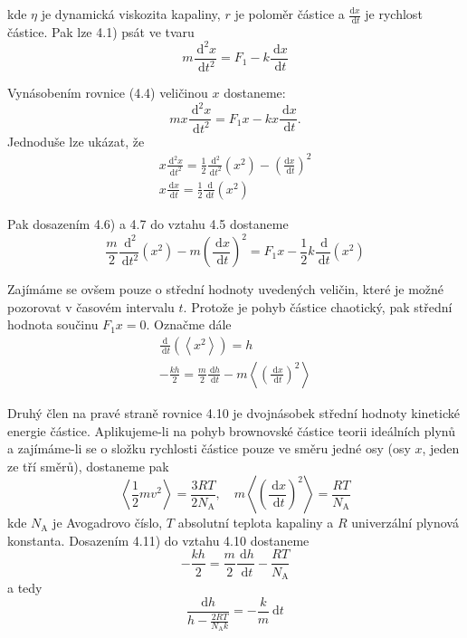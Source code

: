 \documentclass[czech,11pt,a4paper]{article}
\begin{document}
\begin{multicols}{2}
		kde $\eta$ je dynamická viskozita kapaliny, $r$ je poloměr částice a $\frac{\mathrm{d} x}{\mathrm{~d} t}$ je rychlost částice. Pak lze 4.1) psát ve tvaru
		\begin{equation}
			m \frac{\mathrm{~d}^{2} x}{\mathrm{~d} t^{2}}=F_{1}-k \frac{\mathrm{~d} x}{\mathrm{~d} t}
		\end{equation}
		
		
		Vynásobením rovnice (4.4) veličinou $x$ dostaneme:
		\begin{equation}
			m x \frac{\mathrm{~d}^{2} x}{\mathrm{~d} t^{2}}=F_{1} x-k x \frac{\mathrm{~d} x}{\mathrm{~d} t} .
		\end{equation}
		Jednoduše lze ukázat, že
		\begin{gather}
			x \frac{\mathrm{~d}^{2} x}{\mathrm{~d} t^{2}}=\frac{1}{2} \frac{\mathrm{~d}^{2}}{\mathrm{~d} t^{2}}\left(x^{2}\right)-\left(\frac{\mathrm{d} x}{\mathrm{~d} t}\right)^{2} \\
			x \frac{\mathrm{~d} x}{\mathrm{~d} t}=\frac{1}{2} \frac{\mathrm{~d}}{\mathrm{~d} t}\left(x^{2}\right)
		\end{gather}
		
		
		Pak dosazením 4.6) a 4.7 do vztahu 4.5 dostaneme
		$$
		\frac{m}{2} \frac{\mathrm{~d}^{2}}{\mathrm{~d} t^{2}}\left(x^{2}\right)-m\left(\frac{\mathrm{~d} x}{\mathrm{~d} t}\right)^{2}=F_{1} x-\frac{1}{2} k \frac{\mathrm{~d}}{\mathrm{~d} t}\left(x^{2}\right)
		$$
		
		Zajímáme se ovšem pouze o střední hodnoty uvedených veličin, které je možné pozorovat v časovém intervalu $t$. Protože je pohyb částice chaotický, pak střední hodnota součinu $F_{1} x=0$. Označme dále
		$$
		\begin{gathered}
			\frac{\mathrm{d}}{\mathrm{~d} t}\left(\left\langle x^{2}\right\rangle\right)=h \\
			-\frac{k h}{2}=\frac{m}{2} \frac{\mathrm{~d} h}{\mathrm{~d} t}-m\left\langle\left(\frac{\mathrm{~d} x}{\mathrm{~d} t}\right)^{2}\right\rangle
		\end{gathered}
		$$
		
		Druhý člen na pravé straně rovnice 4.10 je dvojnásobek střední hodnoty kinetické energie částice. Aplikujeme-li na pohyb brownovské částice teorii ideálních plynů a zajímáme-li se o složku rychlosti částice pouze ve směru jedné osy (osy $x$, jeden ze tří směrů), dostaneme pak
		$$
		\left\langle\frac{1}{2} m v^{2}\right\rangle=\frac{3 R T}{2 N_{\mathrm{A}}}, \quad m\left\langle\left(\frac{\mathrm{~d} x}{\mathrm{~d} t}\right)^{2}\right\rangle=\frac{R T}{N_{\mathrm{A}}}
		$$
		kde $N_{\mathrm{A}}$ je Avogadrovo číslo, $T$ absolutní teplota kapaliny a $R$ univerzální plynová konstanta. Dosazením 4.11) do vztahu 4.10 dostaneme
		$$
		-\frac{k h}{2}=\frac{m}{2} \frac{\mathrm{~d} h}{\mathrm{~d} t}-\frac{R T}{N_{\mathrm{A}}}
		$$
		a tedy
		$$
		\frac{\mathrm{d} h}{h-\frac{2 R T}{N_{\mathrm{A}} k}}=-\frac{k}{m} \mathrm{~d} t
		$$
		

\end{multicols}
\end{document}
